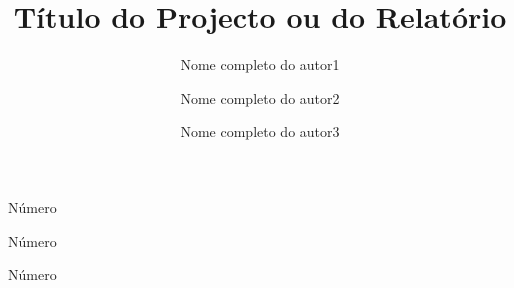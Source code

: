 \title{Título do Projecto ou do Relatório}

\author[f]{Nome completo do autor1}{Número}
\author[m]{Nome completo do autor2}{Número}
\author[m]{Nome completo do autor3}{Número}



